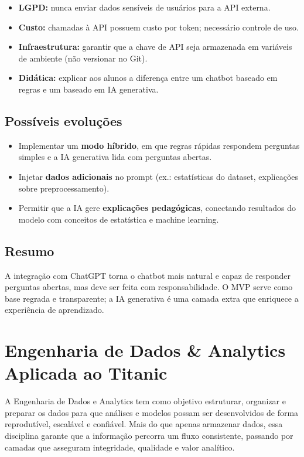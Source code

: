 \documentclass[12pt,a4paper]{article}
\begin{document}
\begin{itemize}
  \item \textbf{LGPD:} nunca enviar dados sensíveis de usuários para a API externa.
  \item \textbf{Custo:} chamadas à API possuem custo por token; necessário controle de uso.
  \item \textbf{Infraestrutura:} garantir que a chave de API seja armazenada em variáveis de ambiente (não versionar no Git).
  \item \textbf{Didática:} explicar aos alunos a diferença entre um chatbot baseado em regras e um baseado em IA generativa.
\end{itemize}

\subsection{Possíveis evoluções}

\begin{itemize}
  \item Implementar um \textbf{modo híbrido}, em que regras rápidas respondem perguntas simples e a IA generativa lida com perguntas abertas.
  \item Injetar \textbf{dados adicionais} no prompt (ex.: estatísticas do dataset, explicações sobre preprocessamento).
  \item Permitir que a IA gere \textbf{explicações pedagógicas}, conectando resultados do modelo com conceitos de estatística e machine learning.
\end{itemize}

\subsection{Resumo}

A integração com ChatGPT torna o chatbot mais natural e capaz de responder perguntas abertas, mas deve ser feita com responsabilidade. O MVP serve como base regrada e transparente; a IA generativa é uma camada extra que enriquece a experiência de aprendizado.

\clearpage
\section{Engenharia de Dados \& Analytics Aplicada ao Titanic}

A Engenharia de Dados e Analytics tem como objetivo estruturar, organizar e preparar os dados para que análises e modelos possam ser desenvolvidos de forma reprodutível, escalável e confiável. 
Mais do que apenas armazenar dados, essa disciplina garante que a informação percorra um fluxo consistente, passando por camadas que asseguram integridade, qualidade e valor analítico.
\end{document}
